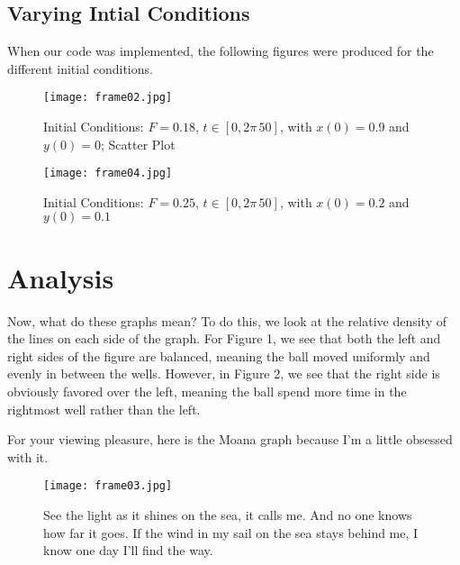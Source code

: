 \documentclass[aps,pra,notitlepage,amsmath,amssymb,letterpaper,12pt]{revtex4-1}
\begin{document}
\subsection{Varying Intial Conditions}
When our code was implemented, the following figures were produced for the different initial conditions.

\begin{figure}[h!] 
  \texttt{[image: frame02.jpg]}  
  \caption{Initial Conditions: $F = 0.18$, $t\in[0,2\pi\, 50]$, with $x(0) = 0.9$ and $y(0) = 0$; Scatter Plot}
  \label{fig:figlabel}
\end{figure}

\begin{figure}[h!] %
  \texttt{[image: frame04.jpg]}  %
  \caption{Initial Conditions: $F = 0.25$, $t\in[0,2\pi\, 50]$, with $x(0) = 0.2$ and $y(0) = 0.1$}
  \label{fig:figlabel}
\end{figure}

\section{Analysis}
Now, what do these graphs mean? To do this, we look at the relative density of the lines on each side of the graph. For Figure 1, we see that both the left and right sides of the figure are balanced, meaning the ball moved uniformly and evenly in between the wells. However, in Figure 2, we see that the right side is obviously favored over the left, meaning the ball spend more time in the rightmost well rather than the left. \par
\noindent
For your viewing pleasure, here is the Moana graph because I'm a little obsessed with it.
\begin{figure}[h!] %
  \texttt{[image: frame03.jpg]}  %
  \caption{See the light as it shines on the sea, it calls me. And no one knows how far it goes. If the wind in my sail on the sea stays behind me, I know one day I'll find the way.}
  \label{fig:figlabel}
\end{figure}
\end{document}
